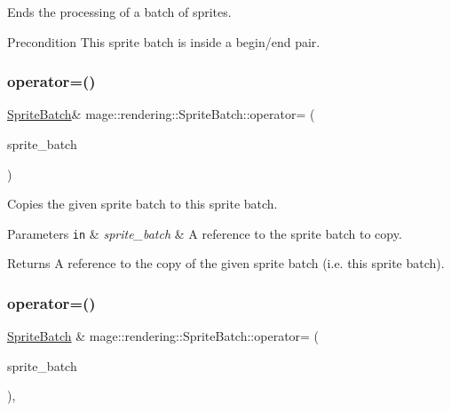 Ends the processing of a batch of sprites.

\begin{DoxyPrecond}{Precondition}
This sprite batch is inside a begin/end pair. 
\end{DoxyPrecond}
\hypertarget{classmage_1_1rendering_1_1_sprite_batch_a336c16ed2eee2ef9fe8520903033f63e}{}\label{classmage_1_1rendering_1_1_sprite_batch_a336c16ed2eee2ef9fe8520903033f63e} 
\subsubsection{\texorpdfstring{operator=()}{operator=()}\hspace{0.1cm}{\footnotesize\ttfamily [1/2]}}
{\footnotesize\ttfamily \hyperlink{classmage_1_1rendering_1_1_sprite_batch}{Sprite\+Batch}\& mage\+::rendering\+::\+Sprite\+Batch\+::operator= (\begin{DoxyParamCaption}\item[{const \hyperlink{classmage_1_1rendering_1_1_sprite_batch}{Sprite\+Batch} \&}]{sprite\+\_\+batch }\end{DoxyParamCaption})\hspace{0.3cm}{\ttfamily [delete]}}

Copies the given sprite batch to this sprite batch.


\begin{DoxyParams}[1]{Parameters}
\mbox{\tt in}  & {\em sprite\+\_\+batch} & A reference to the sprite batch to copy. \\
\hline
\end{DoxyParams}
\begin{DoxyReturn}{Returns}
A reference to the copy of the given sprite batch (i.\+e. this sprite batch). 
\end{DoxyReturn}
\hypertarget{classmage_1_1rendering_1_1_sprite_batch_ae5de43894a07d86a0d2e4150080a7990}{}\label{classmage_1_1rendering_1_1_sprite_batch_ae5de43894a07d86a0d2e4150080a7990} 
\subsubsection{\texorpdfstring{operator=()}{operator=()}\hspace{0.1cm}{\footnotesize\ttfamily [2/2]}}
{\footnotesize\ttfamily \hyperlink{classmage_1_1rendering_1_1_sprite_batch}{Sprite\+Batch} \& mage\+::rendering\+::\+Sprite\+Batch\+::operator= (\begin{DoxyParamCaption}\item[{\hyperlink{classmage_1_1rendering_1_1_sprite_batch}{Sprite\+Batch} \&\&}]{sprite\+\_\+batch }\end{DoxyParamCaption})\hspace{0.3cm}{\ttfamily [default]}, {\ttfamily [noexcept]}}

